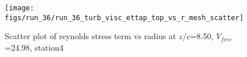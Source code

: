 \begin{figure}[H]
\centering
\texttt{[image: figs/run\_36/run\_36\_turb\_visc\_ettap\_top\_vs\_r\_mesh\_scatter]}
\caption{Scatter plot of reynolds stress term vs radius at $z/c$=8.50, $V_{free}$=24.98, station4}
\label{fig:run_36_turb_visc_ettap_top_vs_r_mesh_scatter}
\end{figure}


